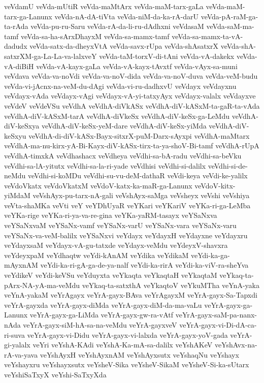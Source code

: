 {veVdamU
veVda-mUtiR
veVda-maMtArx
veVda-maM-tarx-gaLa
veVda-maM-tarx-ga-Lanunx
veVda-nA-dA-tiVta
veVda-niM-da-ka-rA-darU
veVda-pA-raM-ga-ta-rAda
veVda-pu-ru-Saru
veVda-rA-da-li-ru-dAdhxni
veVdasaM
veVda-saM-ma-tamf
veVda-sa-ha-sArxDhayxM
veVda-sa-mamx-tamf
veVda-sa-mamx-ta-vA-dadudx
veVda-satx-da-dheyxVtA
veVda-savx-rUpa
veVda-shAsatxrX
veVda-shA-satxrXM-ga-La-La-va-lalxveY
veVda-taM-torxV-di-tAni
veVda-vA-dakekx
veVda-vA-diBiH
veVda-vA-kayx-gaLa
veVda-vA-kayx-tAvxtf
veVda-vAyx-sa-muni
veVdava
veVda-va-noVdi
veVda-va-noV-dida
veVda-va-noV-duva
veVda-veM-budu
veVda-vi-jAcnx-na-veM-du-dAgi
veVda-vi-ru-dadhxvU
veVdayx
veVdayxnu
veVdayx-vAda
veVdayx-vAgi
veVdayx-vA-yi-tatxyAyx
veVdayx-valalx
veVdayxve
veVdeV
veVdeVSu
veVdhA
veVdhA-diVkASx
veVdhA-diV-kASxM-ta-gaR-ta-vAda
veVdhA-diV-kASxM-tarA
veVdhA-diVkeSx
veVdhA-diV-keSx-ga-LeMdu
veVdhA-diV-keSxya
veVdhA-diV-keSx-yeM-dare
veVdhA-diV-keSx-yiMda
veVdhA-diV-keSxyu
veVdhA-di-diV-kASx-Bayx-sitxrX-puM-Darx-sAyxpi
veVdhA-maMtarx
veVdhA-ma-nu-kirx-yA-Bi-Kayx-diV-kASx-tirx-ta-ya-shoV-Bi-tamf
veVdhA-rUpA
veVdhA-timxkA
veVdhashacx
veVdheya
veVdhi-sa-bA-radu
veVdhi-sa-beVku
veVdhi-sa-lA-yitutx
veVdhi-sa-la-ri-yade
veVdhisi
veVdhi-si-dalilx
veVdhi-si-de-neMdu
veVdhi-si-koMDu
veVdhi-su-vu-deM-dathaR
veVdi-keya
veVdi-ke-yalilx
veVdoVkatx
veVdoVkatxM
veVdoV-katx-ka-maR-ga-Lanunx
veVdoV-kitx-yiMdaM
veVshAyx-pu-tarx-nA-gali
veVshAyx-saMga
veVsheyx
veVshi
veVshiya
veVta-shaMKa
veVti
veY
veYDhUyaR
veYKari
veYKariV
veYKa-ri-ga-LeMba
veYKa-rige
veYKa-ri-ya-va-re-gina
veYKa-yaRM-tasayx
veYSaNxva
veYSaNxvaM
veYSaNx-vamf
veYSaNx-varU
veYSaNx-vara
veYSaNx-varu
veYSaNx-va-veM-balilx
veYSaNxvi
veYdayx
veYdayxH
veYdayxne
veYdayxru
veYdayxsaM
veYdayx-vA-gu-tatxde
veYdayx-veMdu
veYdeyxV-shavxra
veYdeyxpaM
veYdhaqtw
veYdi-kAnAM
veYdika
veYdikaM
veYdi-ka-ga-mAyxnAM
veYdi-ka-ri-gA-ga-de-ya-nalf
veYdi-ka-rirA
veYdi-ka-viV-ra-sheYva
veYdikeV
veYdi-keVSu
veYduyxta
veYkaqta
veYkaqtaH
veYkaqtaM
veYkaq-ta-pArx-NA-yA-ma-veMdu
veYkaq-ta-satxthA
veYkaqtoV
veYkuMTha
veYnA-yaka
veYnA-yakaM
veYrAgayx
veYrA-gayx-BAva
veYrAgayxM
veYrA-gayx-Sa-Tapxdi
veYrA-gayxda
veYrA-gayx-diMda
veYrA-gayx-diM-da-ma-vaLu
veYrA-gayx-ga-Lanunx
veYrA-gayx-ga-LiMda
veYrA-gayx-gw-ra-vAtf
veYrA-gayx-saM-pa-nanx-nAda
veYrA-gayx-siM-hA-sa-na-veMdu
veYrA-gayxveV
veYrA-gayx-vi-Di-dA-ca-ri-suva
veYrA-gayx-vi-Didu
veYrA-gayx-vi-lalxda
veYrA-gayx-yoV-gada
veYrA-gi-yalalx
veYri
veYshA-KAdi
veYshA-Ka-mA-sa-dalilx
veYshAKeV
veYshAvx-na-rA-va-yava
veYshAyxH
veYshAyxnAM
veYshAyxsutx
veYshaqNu
veYshayx
veYshayxru
veYshayxsutx
veYsheV-Sika
veYsheV-SikaM
veYsheV-Si-ka-sUtarx
veYshiSaTxyX
veYshi-SaTxyXda
}
